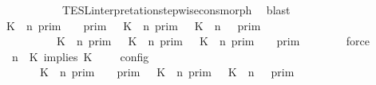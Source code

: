 \begin{isabellebody}
\ \ \ \ \ \ \ \ \ \ \ \ TESL{\isacharunderscore}interpretation{\isacharunderscore}stepwise{\isacharunderscore}cons{\isacharunderscore}morph\ \isamarkupfalse%
\ blast\isanewline
\ \ \ \ \isamarkupfalse%
\ {\isacartoucheopen}{\isasymlbrakk}\ K\ {\isasymnot}{\isasymUp}\ n\ {\isasymrbrakk}\isactrlsub p\isactrlsub r\isactrlsub i\isactrlsub m\ {\isasyminter}\ {\isasymlbrakk}{\isasymlbrakk}\ {\isasymGamma}\ {\isasymrbrakk}{\isasymrbrakk}\isactrlsub p\isactrlsub r\isactrlsub i\isactrlsub m\ {\isasymunion}\ {\isasymlbrakk}\ K\ {\isasymUp}\ n\ {\isasymrbrakk}\isactrlsub p\isactrlsub r\isactrlsub i\isactrlsub m\ {\isasyminter}\ {\isasymlbrakk}{\isasymlbrakk}\ {\isacharparenleft}K\ {\isasymUp}\ n{\isacharparenright}\ {\isacharhash}\ {\isasymGamma}\ {\isasymrbrakk}{\isasymrbrakk}\isactrlsub p\isactrlsub r\isactrlsub i\isactrlsub m\isanewline
\ \ \ \ \ \ \ \ \ {\isacharequal}\ {\isacharparenleft}{\isasymlbrakk}\ K\ {\isasymnot}{\isasymUp}\ n\ {\isasymrbrakk}\isactrlsub p\isactrlsub r\isactrlsub i\isactrlsub m\ {\isasymunion}\ {\isasymlbrakk}\ K\ {\isasymUp}\ n\ {\isasymrbrakk}\isactrlsub p\isactrlsub r\isactrlsub i\isactrlsub m\ {\isasyminter}\ {\isasymlbrakk}\ K\ {\isasymUp}\ n\ {\isasymrbrakk}\isactrlsub p\isactrlsub r\isactrlsub i\isactrlsub m{\isacharparenright}\ {\isasyminter}\ {\isasymlbrakk}{\isasymlbrakk}\ {\isasymGamma}\ {\isasymrbrakk}{\isasymrbrakk}\isactrlsub p\isactrlsub r\isactrlsub i\isactrlsub m{\isacartoucheclose}\isanewline
\ \ \ \ \ \ \isamarkupfalse%
\ force\isanewline
\ \ \ \ \isamarkupfalse%
\ {\isacartoucheopen}{\isasymlbrakk}\ {\isasymGamma}{\isacharcomma}\ n\ {\isasymturnstile}\ {\isacharparenleft}{\isacharparenleft}K\ implies\ K\ {\isacharhash}\ {\isasymPsi}{\isacharparenright}\ {\isasymtriangleright}\ {\isasymPhi}\ {\isasymrbrakk}\isactrlsub c\isactrlsub o\isactrlsub n\isactrlsub f\isactrlsub i\isactrlsub g\isanewline
\ \ \ \ \ \ {\isacharequal}\ {\isacharparenleft}{\isasymlbrakk}\ K\ {\isasymnot}{\isasymUp}\ n\ {\isasymrbrakk}\isactrlsub p\isactrlsub r\isactrlsub i\isactrlsub m\ {\isasyminter}\ {\isasymlbrakk}{\isasymlbrakk}\ {\isasymGamma}\ {\isasymrbrakk}{\isasymrbrakk}\isactrlsub p\isactrlsub r\isactrlsub i\isactrlsub m\ {\isasymunion}\ {\isasymlbrakk}\ K\ {\isasymUp}\ n\ {\isasymrbrakk}\isactrlsub p\isactrlsub r\isactrlsub i\isactrlsub m\ {\isasyminter}\ {\isasymlbrakk}{\isasymlbrakk}\ {\isacharparenleft}K\ {\isasymUp}\ n{\isacharparenright}\ {\isacharhash}\ {\isasymGamma}\ {\isasymrbrakk}{\isasymrbrakk}\isactrlsub p\isactrlsub r\isactrlsub i\isactrlsub m{\isacharparenright}\isanewline

\end{isabellebody}
